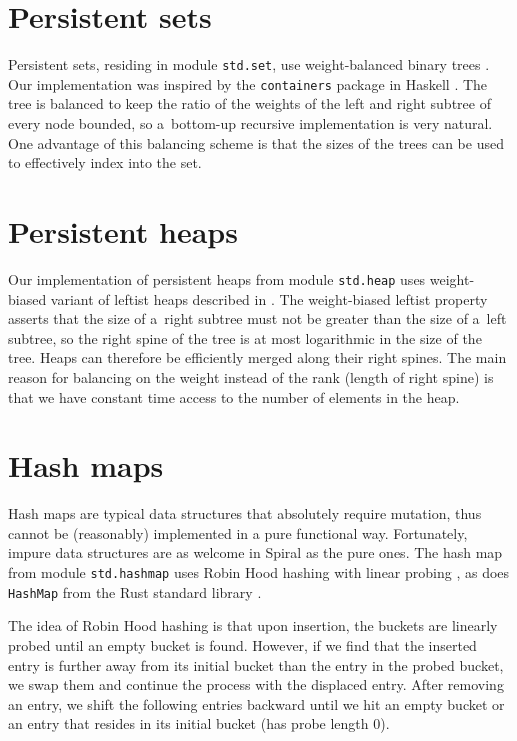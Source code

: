 \documentclass[a4paper,9pt,oneside,twocolumn,article]{memoir}
\begin{document}
\chapter{Persistent sets}

Persistent sets, residing in module \texttt{std.set}, use weight-balanced binary
trees \cite{adams1992implementing}. Our implementation was inspired by the
\texttt{containers} package in Haskell \cite{containers}. The tree is balanced
to keep the ratio of the weights of the left and right subtree of every node
bounded, so a~bottom-up recursive implementation is very natural. One advantage
of this balancing scheme is that the sizes of the trees can be used to
effectively index into the set.

\chapter{Persistent heaps}

Our implementation of persistent heaps from module \texttt{std.heap} uses
weight-biased variant of leftist heaps described in \cite{okasaki1999purely}.
The weight-biased leftist property asserts that the size of a~right subtree must
not be greater than the size of a~left subtree, so the right spine of the tree
is at most logarithmic in the size of the tree. Heaps can therefore be
efficiently merged along their right spines. The main reason for balancing on
the weight instead of the rank (length of right spine) is that we have constant
time access to the number of elements in the heap.

\chapter{Hash maps}

Hash maps are typical data structures that absolutely require mutation, thus
cannot be (reasonably) implemented in a pure functional way. Fortunately, impure
data structures are as welcome in Spiral as the pure ones. The hash map from
module \texttt{std.hashmap} uses Robin Hood hashing \cite{celis1986robin} with
linear probing \cite{robinhood,robinhooddel}, as does \texttt{HashMap} from the
Rust standard library \cite{ruststd}.

The idea of Robin Hood hashing is that upon insertion, the buckets are linearly
probed until an empty bucket is found. However, if we find that the inserted
entry is further away from its initial bucket than the entry in the probed
bucket, we swap them and continue the process with the displaced entry. After
removing an entry, we shift the following entries backward until we hit an empty
bucket or an entry that resides in its initial bucket (has probe length 0).
\end{document}
